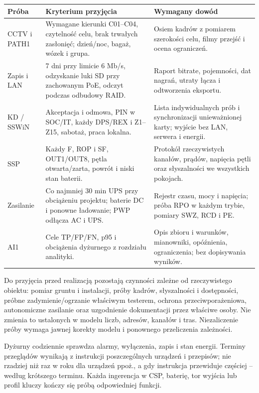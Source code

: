 \begin{tabularx}{\linewidth}{@{}P{28mm}Y Y@{}}
\toprule Próba & Kryterium przyjęcia & Wymagany dowód\\\midrule
CCTV i PATH1 & Wymagane kierunki C01--C04, czytelność celu, brak trwałych zasłonięć; dzień/noc, bagaż, wózek i grupa. & Osiem kadrów z pomiarem szerokości celu, filmy przejść i ocena ograniczeń.\\
Zapis i LAN & 7 dni przy limicie 6 Mb/s, odzyskanie luki SD przy zachowanym PoE, odczyt podczas odbudowy RAID. & Raport bitrate, pojemności, dat nagrań, utraty łącza i odtworzenia eksportu.\\
KD / SSWiN & Akceptacja i odmowa, PIN w SOC/IT, każdy DPS/REX i Z1--Z15, sabotaż, praca lokalna. & Lista indywidualnych prób i synchronizacji unieważnionej karty; wyjście bez LAN, serwera i energii.\\
SSP & Każdy F, ROP i SF, OUT1/OUT8, pętla otwarta/zarta, powrót i niski stan baterii. & Protokół rzeczywistych kanałów, prądów, napięcia pętli oraz słyszalności we wszystkich pokojach.\\
Zasilanie & Co najmniej 30 min UPS przy obciążeniu projektu; baterie DC i ponowne ładowanie; PWP odłącza AC i UPS. & Rejestr czasu, mocy i napięcia; próba RPO w każdym trybie, pomiary SWZ, RCD i PE.\\
AI1 & Cele TP/FP/FN, p95 i obciążenia dyżurnego z rozdziału analityki. & Opis zbioru i warunków, mianowniki, opóźnienia, ograniczenia; bez dopisywania wyników.\\\bottomrule
\end{tabularx}

Do przyjęcia przed realizacją pozostają czynności zależne od rzeczywistego obiektu: pomiar gruntu i instalacji, próby kadrów, słyszalności i dostępności, próbne zadymienie/ogrzanie właściwym testerem, ochrona przeciwporażeniowa, autonomiczne zasilanie oraz uzgodnienie dokumentacji przez właściwe osoby. Nie zmienia to ustalonych w modelu liczb, adresów, kanałów i tras. Niezaliczenie próby wymaga jawnej korekty modelu i ponownego przeliczenia zależności.

Dyżurny codziennie sprawdza alarmy, wyłączenia, zapis i stan energii. Terminy przeglądów wynikają z instrukcji poszczególnych urządzeń i przepisów; nie rzadziej niż raz w roku dla urządzeń ppoż., a gdy instrukcja przewiduje częściej -- według krótszego terminu. Każda ingerencja w CSP, baterię, tor wyjścia lub profil kluczy kończy się próbą odpowiedniej funkcji.\cite{L-FIRE}
